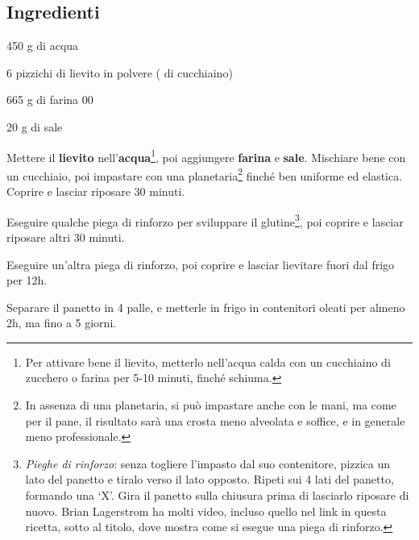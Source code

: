 \newpage
{} \label{pizza_napolitana}

\subsection*{Ingredienti}
\begin{ingredients}
	\item 450 g di acqua
	\item 6 pizzichi di lievito in polvere ( di cucchiaino)
	\item 665 g di farina 00
	\item 20 g di sale
\end{ingredients}


\medskip

Mettere il \textbf{lievito} nell'\textbf{acqua}\footnote{Per attivare bene il lievito, metterlo nell'acqua calda con un cucchiaino di zucchero o farina per 5-10 minuti, finché schiuma.}, poi aggiungere \textbf{farina} e \textbf{sale}. 
Mischiare bene con un cucchiaio, poi impastare con una planetaria\footnote{In assenza di una planetaria, si può impastare anche con le mani, ma come per il pane, il risultato sarà una crosta meno alveolata e soffice, e in generale meno professionale.} finché ben uniforme ed elastica. 
Coprire e lasciar riposare 30 minuti. 

Eseguire qualche piega di rinforzo per sviluppare il glutine\footnote{\textit{Pieghe di rinforzo}: senza togliere l'impasto dal suo contenitore, pizzica un lato del panetto e tiralo verso il lato opposto. Ripeti sui 4 lati del panetto, formando una `X'. Gira il panetto sulla chiusura prima di lasciarlo riposare di nuovo. Brian Lagerstrom ha molti video, incluso quello nel link in questa ricetta, sotto al titolo, dove mostra come si esegue una piega di rinforzo.\label{pieghe_rinforzo}}, poi coprire e lasciar riposare altri 30 minuti.

Eseguire un'altra piega di rinforzo, poi coprire e lasciar lievitare fuori dal frigo per 12h.

Separare il panetto in 4 palle, e metterle in frigo in contenitori oleati per almeno 2h, ma fino a 5 giorni.

